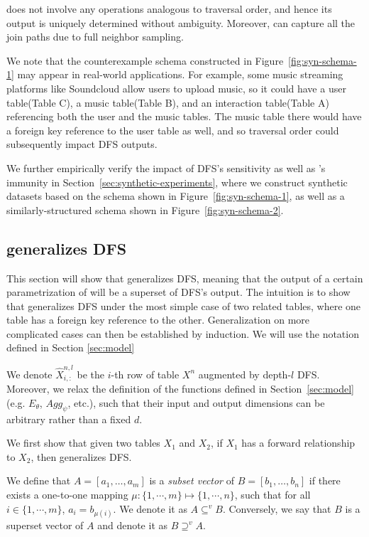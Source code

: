 \begin{remark}
    \model{} does not involve any operations analogous to traversal order, and hence its output is uniquely determined without ambiguity. Moreover,  \model{} can capture all the join paths due to full neighbor sampling.
\end{remark}

We note that the counterexample schema constructed in Figure~\ref{fig:syn-schema-1} may appear in real-world applications.  For example, some music streaming platforms like Soundcloud allow users to upload music, so it could have a user table(Table C), a music table(Table B), and an interaction table(Table A) referencing both the user and the music tables.  The music table there would have a foreign key reference to the user table as well, and so traversal order could subsequently impact DFS outputs.

We further empirically verify the impact of DFS's sensitivity as well as \model{}'s immunity in Section~\ref{sec:synthetic-experiments}, where we construct synthetic datasets based on the schema shown in Figure~\ref{fig:syn-schema-1}, as well as a similarly-structured schema shown in Figure~\ref{fig:syn-schema-2}.

\subsection{\model{} generalizes DFS}

This section will show that \model{} generalizes DFS, meaning that the output of a certain parametrization of \model{} will be a superset of DFS's output.  The intuition is to show that \model{} generalizes DFS under the most simple case of two related tables, where one table has a foreign key reference to the other.  Generalization on more complicated cases can then be established by induction. We will use the notation defined in Section \ref{sec:model}

We denote $\hat{X}^{n,l}_{i,:}$ be the $i$-th row of table $X^n$ augmented by depth-$l$ DFS.  Moreover, we relax the definition of the functions  defined in Section~\ref{sec:model} (e.g. $E_\theta$, $Agg_\psi$, etc.), such that their input and output dimensions can be arbitrary rather than a fixed $d$.

We first show that given two tables $X_1$ and $X_2$, if $X_1$ has a forward relationship to $X_2$, then \model{} generalizes DFS.
\begin{definition}
    We define that $A=[a_1, \ldots, a_m]$ is a \emph{subset vector} of $B=[b_1, \ldots, b_n]$ if there exists a one-to-one mapping $\mu: \{1, \cdots, m\} \mapsto \{1, \cdots, n\}$, such that for all $i \in \{1, \cdots, m\}$, $a_i = b_{\mu(i)}$.  We denote it as $A \subseteq^v B$.  Conversely, we say that $B$ is a superset vector of $A$ and denote it as $B \supseteq^v A$.
\end{definition}

